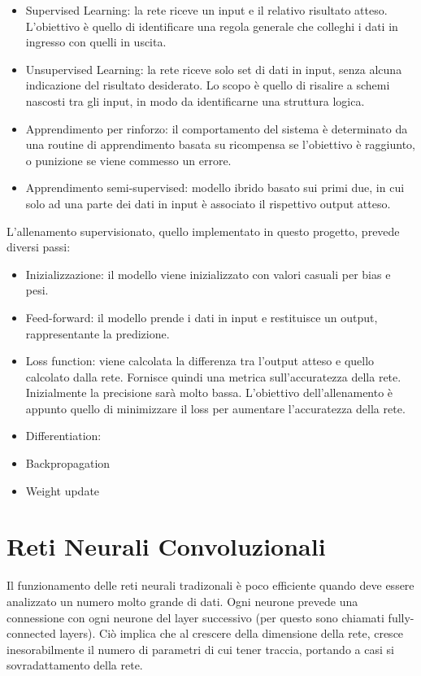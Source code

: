 \documentclass{article}
\begin{document}
\begin{itemize}
\item Supervised Learning: la rete riceve un input e il relativo risultato atteso. L'obiettivo è quello di identificare una regola generale che colleghi i dati in ingresso con quelli in uscita.
\item Unsupervised Learning: la rete riceve solo set di dati in input, senza alcuna indicazione del risultato desiderato. Lo scopo è quello di risalire a schemi nascosti tra gli input, in modo da identificarne una struttura logica.
\item Apprendimento per rinforzo: il comportamento del sistema è determinato da una routine di apprendimento basata su ricompensa se l'obiettivo è raggiunto, o punizione se viene commesso un errore.
\item Apprendimento semi-supervised: modello ibrido basato sui primi due, in cui solo ad una parte dei dati in input è associato il rispettivo output atteso.
\end{itemize}

L'allenamento supervisionato, quello implementato in questo progetto, prevede diversi passi:
\begin{itemize}
\item Inizializzazione: il modello viene inizializzato con valori casuali per bias e pesi. 
\item Feed-forward: il modello prende i dati in input e restituisce un output, rappresentante la predizione.
\item Loss function: viene calcolata la differenza tra l'output atteso e quello calcolato dalla rete. Fornisce quindi una metrica sull'accuratezza della rete.  Inizialmente la precisione sarà molto bassa. L'obiettivo dell'allenamento è appunto quello di minimizzare il loss per aumentare l'accuratezza della rete. 
\item Differentiation: 
\item Backpropagation 
\item Weight update 
\end{itemize}

\section{Reti Neurali Convoluzionali}
Il funzionamento delle reti neurali tradizonali è poco efficiente quando deve essere analizzato un numero molto grande di dati. Ogni neurone prevede una connessione con ogni neurone del layer successivo (per questo sono chiamati fully-connected layers). Ciò implica che al crescere della dimensione della rete, cresce inesorabilmente il numero di parametri di cui tener traccia, portando a casi si sovradattamento della rete.
\end{document}
